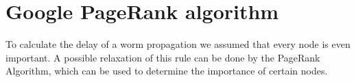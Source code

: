 %
%


%
%
%
%
%
%	
%	
%
%	
%				
%				
%				
%		
\section{Google PageRank algorithm}

To calculate the delay of a worm propagation we assumed that every node is even important. A possible relaxation of this rule can be done by the PageRank Algorithm, which can be used to determine the importance of certain nodes. 

